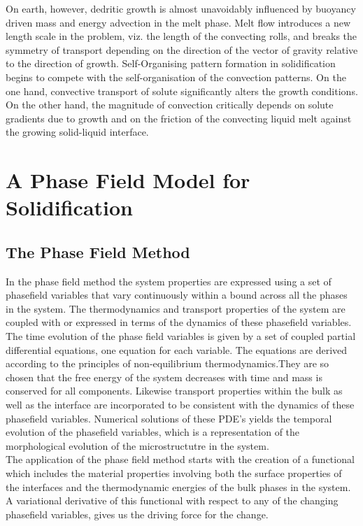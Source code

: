 \documentclass[a4paper]{report}
\begin{document}
On earth, however, dedritic growth is almost unavoidably influenced by buoyancy driven 
mass and energy advection in the melt phase. Melt flow introduces a new length scale in 
the problem, viz. the length of the convecting rolls, and breaks the symmetry of transport 
depending on the direction of the vector of gravity relative to the direction of growth. 
Self-Organising pattern formation in solidification begins to compete with the self-organisation 
of the convection patterns. On the one hand, convective transport of solute significantly alters the growth conditions. On the other hand, the magnitude of convection critically depends on solute 
gradients due to growth and on the friction of the convecting liquid melt against the 
growing solid-liquid interface\cite{Stein}.


\chapter{A Phase Field Model for Solidification}

\section{The Phase Field Method}

In the phase field method the system properties are expressed using a set of phasefield variables 
that vary continuously within a bound across all the phases in the system. The thermodynamics and 
transport properties of the system are coupled with or expressed in terms of the dynamics of these 
phasefield variables.\\

The time evolution of the phase field variables is given by a set of coupled partial differential 
equations, one equation for each variable. The equations are derived according to the principles of 
non-equilibrium thermodynamics.They are so chosen that the free energy of the system decreases with 
time and mass is conserved for all components. Likewise transport properties within the bulk as well as 
the interface are incorporated to be consistent with the dynamics of these phasefield variables. 
Numerical solutions of these PDE's yields the temporal evolution of the phasefield variables, which is 
a representation of the morphological evolution of the microstructutre in the system.\\

The application of the phase field method starts with the creation of a functional which includes the 
material properties involving both the surface properties of the interfaces and the thermodynamic energies 
of the bulk phases in the system. A variational derivative of this functional with respect to any of the 
changing phasefield variables, gives us the driving force for the change. 
\end{document}
